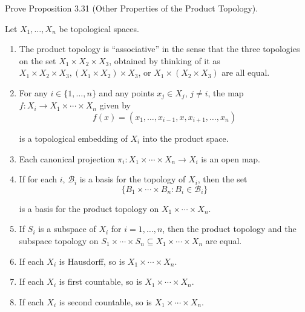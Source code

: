 \begin{exercise}{3.32}
    Prove Proposition 3.31 (Other Properties of the Product Topology).

    Let $X_{1}, \ldots, X_{n}$ be topological spaces.
    \begin{enumerate}[label={(\alph*)}]
        \item The product topology is ``associative'' in the sense that the three topologies on
              the set $X_{1} \times X_{2} \times X_{3}$, obtained by thinking of it as $X_{1} \times X_{2} \times X_{3}, (X_{1} \times X_{2}) \times X_{3}$, or $X_{1} \times (X_{2} \times X_{3})$ are all equal.
        \item For any $i\in\{1,\ldots,n\}$ and any points $x_{j}\in X_{j}$, $j\ne i$, the map $f: X_{i}\to X_{1}\times \cdots \times X_{n}$ given by
              \[
                  f(x) = (x_{1}, \ldots, x_{i-1}, x, x_{i+1}, \ldots, x_{n})
              \]

              is a topological embedding of $X_{i}$ into the product space.
        \item Each canonical projection $\pi_{i}: X_{1}\times\cdots\times X_{n}\to X_{i}$ is an open map.
        \item If for each $i$, $\mathscr{B}_{i}$ is a basis for the topology of $X_{i}$, then the set
              \[
                  \{ B_{1}\times\cdots\times B_{n} : B_{i}\in\mathscr{B}_{i} \}
              \]

              is a basis for the product topology on $X_{1}\times\cdots\times X_{n}$.
        \item If $S_{i}$ is a subspace of $X_{i}$ for $i = 1,\ldots,n$, then the product topology and the subspace topology on $S_{1}\times \cdots \times S_{n}\subseteq X_{1}\times \cdots\times X_{n}$ are equal.
        \item If each $X_{i}$ is Hausdorff, so is $X_{1}\times\cdots\times X_{n}$.
        \item If each $X_{i}$ is first countable, so is $X_{1}\times\cdots\times X_{n}$.
        \item If each $X_{i}$ is second countable, so is $X_{1}\times\cdots\times X_{n}$.
    \end{enumerate}
\end{exercise}

